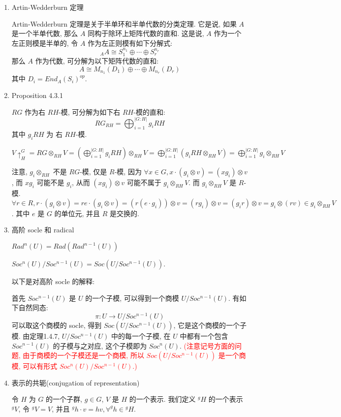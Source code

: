 \documentclass{ctexart}
\newcommand{\abs}[1]{\left\lvert#1\right\rvert}
\begin{document}
\begin{enumerate}
\item Artin-Wedderburn 定理

Artin-Wedderburn 定理是关于半单环和半单代数的分类定理. 它是说, 如果 $A$ 是一个半单代数, 那么 $A$ 同构于除环上矩阵代数的直和. 这是说, $A$ 作为一个左正则模是半单的, 令 $A$ 作为左正则模有如下分解式:
\[
_AA \cong S_1^{n_1} \oplus \cdots \oplus S_r^{n_r}
\]
那么 $A$ 作为代数, 可分解为以下矩阵代数的直和:
\[
A \cong M_{n_1}(D_1) \oplus \cdots \oplus M_{n_r}(D_r)
\]
其中 $D_i = End_A(S_i)^{op}$.

\item Proposition 4.3.1

$RG$ 作为右 $RH$-模, 可分解为如下右 $RH$-模的直和:
\[
RG_{RH} = \bigoplus^{\abs{G:H}}_{i=1} g_iRH
\]
其中 $g_iRH$ 为 右 $RH$-模.

$V\uparrow^G_H = RG \otimes_{RH}V = (\bigoplus^{\abs{G:H}}_{i=1} g_iRH) \otimes_{RH} V = \bigoplus^{\abs{G:H}}_{i=1}(g_iRH \otimes_{RH} V) = \bigoplus^{\abs{G:H}}_{i=1} g_i\otimes_{RH}V$

注意, $g_i\otimes_{RH}$ 不是 $RG$-模, 仅是 $R$-模, 因为 $\forall x \in G, x\cdot (g_i\otimes v) = (xg_i)\otimes v$, 而 $xg_i$ 可能不是 $g_i$, 从而 $(xg_i)\otimes v$ 可能不属于 $g_i \otimes_{RH} V$. 而 $g_i\otimes_{RH}V$ 是 $R$-模. $\forall r \in R, r \cdot (g_i\otimes v) = re\cdot(g_i\otimes v) = (r(e\cdot g_i))\otimes v = (rg_i)\otimes v = (g_ir)\otimes v = g_i\otimes (rv) \in g_i \otimes_{RH} V$. 其中 $e$ 是 $G$ 的单位元, 并且 $R$ 是交换的.

\item 高阶 socle 和 radical

$Rad^n(U) = Rad(Rad^{n-1}(U))$

$Soc^n(U)/Soc^{n-1}(U) = Soc(U/Soc^{n-1}(U))$.

以下是对高阶 socle 的解释:

首先 $Soc^{n-1}(U)$ 是 $U$ 的一个子模, 可以得到一个商模 $U/Soc^{n-1}(U)$. 有如下自然同态:
\[
\pi : U \to U/Soc^{n-1}(U)
\]
可以取这个商模的 socle, 得到 $Soc(U/Soc^{n-1}(U))$, 它是这个商模的一个子模. 由定理1.4.7\cite{dlab2012finite}, $U/Soc^{n-1}(U)$ 中的每一个子模, 在 $U$ 中都有一个包含 $Soc^{n-1}(U)$ 的子模与之对应, 这个子模即为 $Soc^n(U)$. \textcolor{red}{(注意记号方面的问题, 由于商模的一个子模还是一个商模, 所以 $Soc(U/Soc^{n-1}(U))$ 是一个商模, 可以有形式 $Soc^n(U)/Soc^{n-1}(U)$.)}

\item 表示的共轭(conjugation of representation)

令 $H$ 为 $G$ 的一个子群, $g \in G$, $V$ 是 $H$ 的一个表示. 我们定义 $^gH$ 的一个表示 $^gV$, 令 $^gV = V$, 并且 $^gh \cdot v = hv, \forall ^gh \in {}^gH$.


\end{enumerate}
\end{document}
